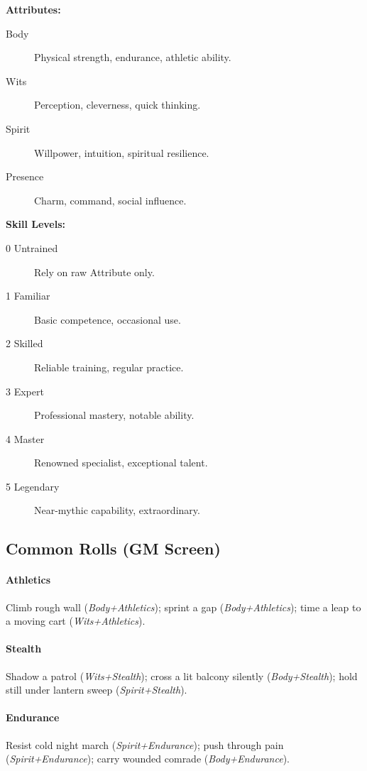 \textbf{Attributes:}
\begin{description}
    \item[Body] Physical strength, endurance, athletic ability.
    \item[Wits] Perception, cleverness, quick thinking.
    \item[Spirit] Willpower, intuition, spiritual resilience.
    \item[Presence] Charm, command, social influence.
\end{description}

\textbf{Skill Levels:}
\begin{description}
    \item[0 Untrained] Rely on raw Attribute only.
    \item[1 Familiar] Basic competence, occasional use.
    \item[2 Skilled] Reliable training, regular practice.
    \item[3 Expert] Professional mastery, notable ability.
    \item[4 Master] Renowned specialist, exceptional talent.
    \item[5 Legendary] Near-mythic capability, extraordinary.
\end{description}

\subsection{Common Rolls (GM Screen)}\label{subsec:common_rolls}

\paragraph{Athletics}
Climb rough wall (\emph{Body+Athletics}); sprint a gap (\emph{Body+Athletics}); time a leap to a moving cart (\emph{Wits+Athletics}).

\paragraph{Stealth}
Shadow a patrol (\emph{Wits+Stealth}); cross a lit balcony silently (\emph{Body+Stealth}); hold still under lantern sweep (\emph{Spirit+Stealth}).

\paragraph{Endurance}
Resist cold night march (\emph{Spirit+Endurance}); push through pain (\emph{Spirit+Endurance}); carry wounded comrade (\emph{Body+Endurance}).

